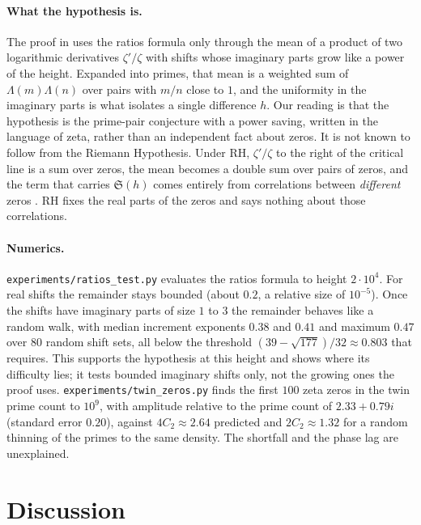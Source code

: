 \documentclass[11pt]{article}
\theoremstyle{definition}
\theoremstyle{remark}
\newcommand{\lean}[1]{\texttt{#1}}
\begin{document}
\paragraph{What the hypothesis is.} The proof in \cite{lee} uses the ratios
formula only through the mean of a product of two logarithmic derivatives
$\zeta'/\zeta$ with shifts whose imaginary parts grow like a power of the
height. Expanded into primes, that mean is a weighted sum of
$\Lambda(m)\Lambda(n)$ over pairs with $m/n$ close to $1$, and the uniformity in
the imaginary parts is what isolates a single difference $h$. Our reading is
that the hypothesis is the prime-pair conjecture with a power saving, written in
the language of zeta, rather than an independent fact about zeros. It is not
known to follow from the Riemann Hypothesis. Under RH, $\zeta'/\zeta$ to the
right of the critical line is a sum over zeros, the mean becomes a double sum
over pairs of zeros, and the term that carries $\mathfrak{S}(h)$ comes entirely
from correlations between \emph{different} zeros \cite{montgomery,bk}. RH fixes
the real parts of the zeros and says nothing about those correlations.

\paragraph{Numerics.} \lean{experiments/ratios\_test.py} evaluates the ratios
formula to height $2\cdot10^4$. For real shifts the remainder stays bounded
(about $0.2$, a relative size of $10^{-5}$). Once the shifts have imaginary
parts of size $1$ to $3$ the remainder behaves like a random walk, with
median increment exponents $0.38$ and $0.41$ and maximum $0.47$ over $80$ random
shift sets, all below the threshold $(39-\sqrt{177})/32\approx0.803$ that \cite{lee} requires.
This supports the hypothesis at this height and shows where its difficulty
lies; it tests bounded imaginary shifts only, not the growing ones the proof
uses. \lean{experiments/twin\_zeros.py} finds the first $100$ zeta zeros in the
twin prime count to $10^9$, with amplitude relative to the prime count of
$2.33+0.79i$ (standard error $0.20$), against $4C_2\approx2.64$ predicted and
$2C_2\approx1.32$ for a random thinning of the primes to the same density. The
shortfall and the phase lag are unexplained.

\section{Discussion}\label{sec:discussion}
\end{document}
